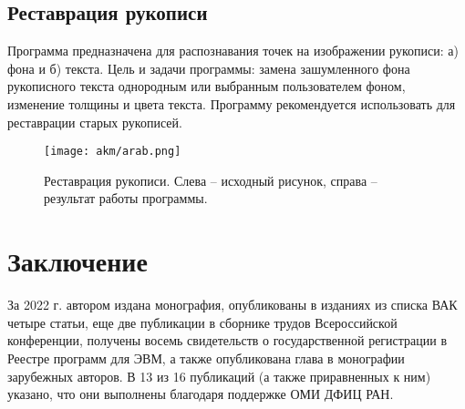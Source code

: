 \subsection{Реставрация рукописи}

Программа предназначена для распознавания точек на изображении рукописи: а) фона и б) текста. Цель и задачи программы: замена зашумленного фона рукописного текста однородным или выбранным пользователем фоном, изменение толщины и цвета текста.
Программу рекомендуется использовать для реставрации старых рукописей. 

\begin{figure}[h]
    \begin{center}
        \texttt{[image: akm/arab.png]}
    \end{center}
    \caption*{Реставрация рукописи. Слева -- исходный рисунок, справа -- результат работы программы.}
\end{figure}


\section{Заключение}

За 2022 г. автором издана монография, опубликованы  в изданиях из списка ВАК  четыре статьи, еще две публикации в сборнике трудов Всероссийской конференции, получены восемь свидетельств о государственной регистрации в Реестре программ для ЭВМ, а также опубликована глава в монографии зарубежных авторов. В 13 из 16 публикаций (а также приравненных к ним) указано, что они выполнены благодаря поддержке ОМИ ДФИЦ РАН.
